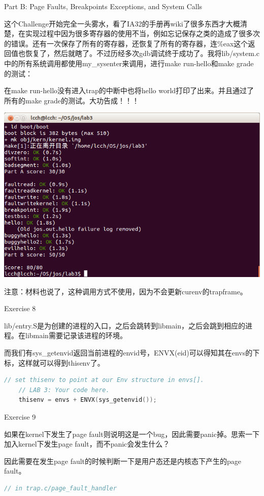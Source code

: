 \documentclass[GBK,winfonts,a4paper,10pt]{ctexart}
\begin{document}
\begin{section}{ Part B: Page Faults, Breakpoints Exceptions, and System Calls }
\begin{subsection}{ \color[rgb]{1,0,0}{Challenge 3: sysenter/sysexit} }
\par
这个Challenge开始完全一头雾水，看了IA32的手册再wiki了很多东西才大概清楚，在实现过程中因为很多寄存器的使用不当，例如忘记保存之类的造成了很多次的错误。还有一次保存了所有的寄存器，还恢复了所有的寄存器，连\%eax这个返回值也恢复了，然后就瞎了。不过历经多次gdb调试终于成功了。我将lib/system.c中的所有系统调用都使用my\_sysenter来调用，进行make run-hello和make grade的测试：\par
\par
在make run-hello没有进入trap的中断中也将hello world打印了出来。并且通过了所有的make grade的测试。大功告成！！！\par
\includegraphics[scale=0.5]{ch3.png}
\par
注意：材料也说了，这种调用方式不使用，因为不会更新curenv的trapframe。
\end{subsection}

\begin{subsection}{ Exercise 8 }
\par
lib/entry.S是为创建的进程的入口，之后会跳转到libmain，之后会跳到相应的进程。在libmain需要记录该进程的环境。
\par
而我们有sys\_getenvid返回当前进程的envid号，ENVX(eid)可以得知其在envs的下标，这样就可以得到thisenv了。
\begin{lstlisting}[language=C]
	// set thisenv to point at our Env structure in envs[].
	// LAB 3: Your code here.
	thisenv = envs + ENVX(sys_getenvid());
\end{lstlisting}

\end{subsection}

\begin{subsection}{ Exercise 9 }
\par
如果在kernel下发生了page fault则说明这是一个bug，因此需要panic掉。思索一下加入kernel下发生page fault，而不panic会发生什么？
\par
因此需要在发生page fault的时候判断一下是用户态还是内核态下产生的page fault。
\par
\begin{lstlisting}[language=C]
// in trap.c/page_fault_handler


\end{lstlisting}
\end{subsection}
\end{section}
\end{document}
